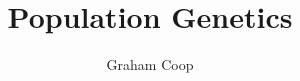 \documentclass{tufte-book}
\begin{document}
\title{Population Genetics}
\author{Graham Coop}


\date{}
\maketitle

\tableofcontents

\newpage



%



%



\end{document}
